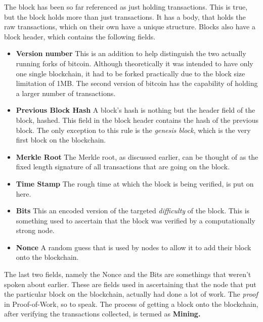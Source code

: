 \documentclass[12pt,a4paper]{report}
\begin{document}
\begin{flushleft}
The block has been so far referenced as just holding transactions. This is true, but the block holds more than just transactions. It has a body, that holds the raw transactions, which on their own have a unique structure. Blocks also have a block header, which contains the following fields.
\begin{itemize}
    \item \textbf{Version number}\newline
    This is an addition to help distinguish the two actually running forks of bitcoin.
    Although theoretically it was intended to have only one single blockchain, it had to be forked practically due to the block size limitation of 1MB. The second version of bitcoin has the capability of holding a larger number of transactions.
    \item \textbf{Previous Block Hash}\newline
    A block's hash is nothing but the header field of the block, hashed. This field in the block header contains the hash of the previous block. The only exception to this rule is the \textit{genesis block}, which is the very first block on the blockchain.
    \item \textbf{Merkle Root}\newline
    The Merkle root, as discussed earlier, can be thought of as the fixed length signature of all transactions that are going on the block.
    \item \textbf{Time Stamp}\newline
    The rough time at which the block is being verified, is put on here.
    \item \textbf{Bits}\newline
    This an encoded version of the targeted \textit{difficulty} of the block. This is something used to ascertain that the block was verified by a computationally strong node.
    \item \textbf{Nonce}\newline
    A random guess that is used by nodes to allow it to add their block onto the blockchain.
    
\end{itemize}

The last two fields, namely the Nonce and the Bits are somethings that weren't spoken about earlier. These are fields used in ascertaining that the node that put the particular block on the blockchain, actually had done a lot of work. The \textit{proof} in Proof-of-Work, so to speak. The process of getting a block onto the blockchain, after verifying the transactions collected, is termed as \textbf{Mining.}


\end{flushleft}
\end{document}
